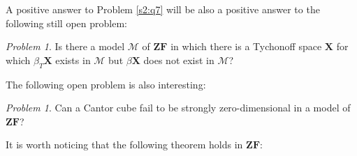 \documentclass[12pt,twoside,leqno]{article}
\theoremstyle{plain}
\theoremstyle{definition}
\theoremstyle{remark}
\newtheorem{problem}[theorem]{Problem}
\begin{document}
A positive answer to Problem \ref{s2:q7} will be also a positive answer to the following still open problem:

\begin{problem}
	\label{s2:q8}
	Is there a model $\mathcal{M}$ of $\mathbf{ZF}$ in which there is a Tychonoff space $\mathbf{X}$ for which $\beta_T\mathbf{X}$ exists in $\mathcal{M}$ but $\beta\mathbf{X}$ does not exist in $\mathcal{M}$?
\end{problem}

The following open problem is also interesting:

\begin{problem}
	\label{s2:q9}
	Can a Cantor cube fail to be strongly zero-dimensional in a model of $\mathbf{ZF}$?
\end{problem}

It is worth noticing that the following theorem holds in $\mathbf{ZF}$:
\end{document}
